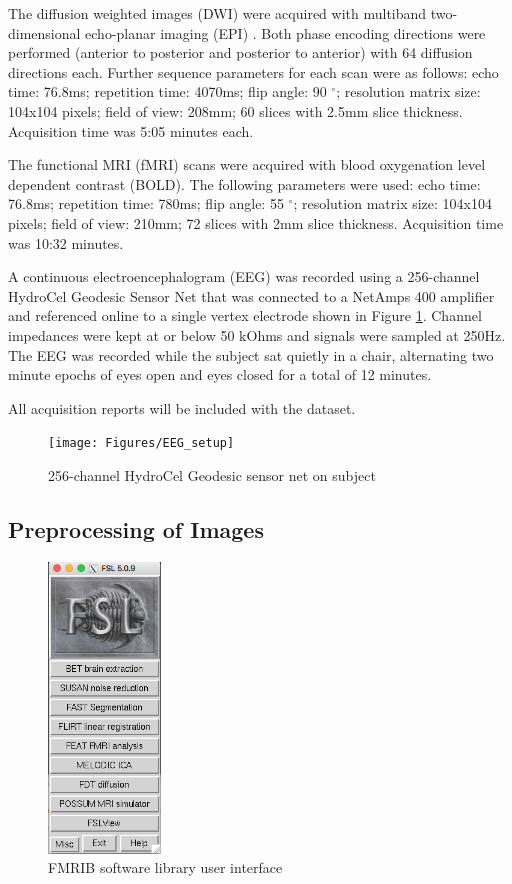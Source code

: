 The diffusion weighted images (DWI) were acquired with multiband two-dimensional echo-planar imaging (EPI) \cite{ref:epi}. Both phase encoding directions were performed (anterior to posterior and posterior to anterior) with 64 diffusion directions each. Further sequence parameters for each scan were as follows: echo time: 76.8ms; repetition time: 4070ms; flip angle: 90 $^{\circ}$; resolution matrix size: 104x104 pixels; field of view: 208mm; 60 slices with 2.5mm slice thickness. Acquisition time was 5:05 minutes each. 

The functional MRI (fMRI) scans were acquired with blood oxygenation level dependent contrast (BOLD). The following parameters were used:  echo time: 76.8ms; repetition time: 780ms; flip angle: 55 $^{\circ}$; resolution matrix size: 104x104 pixels; field of view: 210mm; 72 slices with 2mm slice thickness. Acquisition time was 10:32 minutes.

A continuous electroencephalogram (EEG) was recorded using a 256-channel HydroCel Geodesic Sensor Net that was connected to a NetAmps 400 amplifier and referenced online to a single vertex electrode shown in Figure \ref{fig:eegsetup}. Channel impedances were kept at or below 50 kOhms and signals were sampled at 250Hz. The EEG was recorded while the subject sat quietly in a chair, alternating two minute epochs of eyes open and eyes closed for a total of 12 minutes. 

All acquisition reports will be included with the dataset. 

\begin{figure}[!th]
    \centering
    \texttt{[image: Figures/EEG\_setup]}
    \caption{256-channel HydroCel Geodesic sensor net on subject}
    \label{fig:eegsetup}
\end{figure}

\subsection{Preprocessing of Images}
\label{sec:preprocess}

\begin{figure}
    \centering
    \vspace{-63pt}
    \includegraphics[width=3cm]{Figures/FSL}
    \caption{FMRIB software library user interface}
    \label{fig:fsl}
\end{figure}

